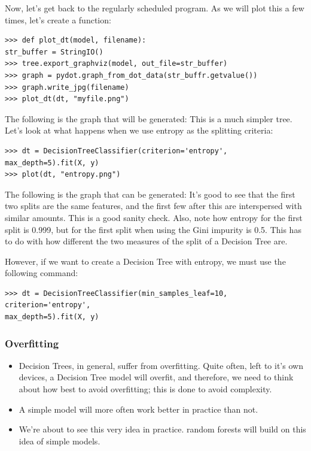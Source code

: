 \documentclass[SKL-MASTER.tex]{subfiles}
\begin{document}
Now, let's get back to the regularly scheduled program.
As we will plot this a few times, let's create a function:
\begin{framed}
\begin{verbatim}
>>> def plot_dt(model, filename):
str_buffer = StringIO()
>>> tree.export_graphviz(model, out_file=str_buffer)
>>> graph = pydot.graph_from_dot_data(str_buffr.getvalue())
>>> graph.write_jpg(filename)
>>> plot_dt(dt, "myfile.png")
\end{verbatim}
\end{framed}
The following is the graph that will be generated:
This is a much simpler tree. Let's look at what happens when we use entropy as the
splitting criteria:
\begin{framed}
\begin{verbatim}
>>> dt = DecisionTreeClassifier(criterion='entropy',
max_depth=5).fit(X, y)
>>> plot(dt, "entropy.png")
\end{verbatim}
\end{framed}
The following is the graph that can be generated:
It's good to see that the first two splits are the same features, and the first few after this are
interspersed with similar amounts. This is a good sanity check.
Also, note how entropy for the first split is 0.999, but for the first split when using the Gini
impurity is 0.5. This has to do with how different the two measures of the split of a Decision
Tree are. 

However, if we want
to create a Decision Tree with entropy, we must use the following command:
\begin{framed}
\begin{verbatim}
>>> dt = DecisionTreeClassifier(min_samples_leaf=10,
criterion='entropy',
max_depth=5).fit(X, y)
\end{verbatim}
\end{framed}
\subsubsection*{Overfitting}
\begin{itemize}
\item Decision Trees, in general, suffer from overfitting. Quite often, left to it's own devices, a
Decision Tree model will overfit, and therefore, we need to think about how best to avoid
overfitting; this is done to avoid complexity. 
\item A simple model will more often work better in
practice than not.
\item We're about to see this very idea in practice. random forests will build on this idea of
simple models.
\end{itemize}
\end{document}
